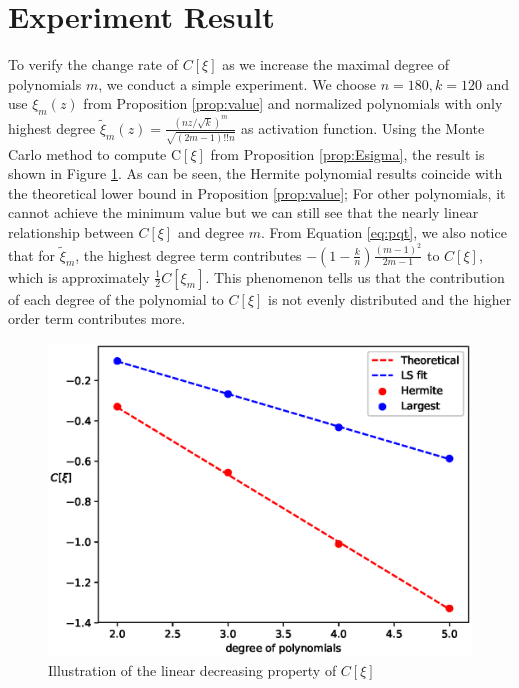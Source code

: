 \documentclass[conference]{IEEEtran}
\begin{document}
\section{Experiment Result}\label{sec:er}

To verify the change rate of $C[\xi]$ as we increase the maximal degree of polynomials $m$,
we conduct a simple experiment. We choose $n=180, k=120$ and use $\xi_m(z)$ from Proposition
\ref{prop:value} and normalized polynomials with only highest degree $\tilde{\xi}_m(z) = \frac{(nz/\sqrt{k})^m}{\sqrt{(2m-1)!!n}}$ as activation function. Using the Monte Carlo method to compute $\mathrm{C}[\xi]$ from Proposition \ref{prop:Esigma}, the result is shown in Figure \ref{fig:fixednk}. As can be seen, the Hermite polynomial results coincide with the theoretical lower bound in Proposition \ref{prop:value}; For other polynomials, it cannot achieve the minimum value but we can still see that the nearly linear relationship between $C[\xi]$ and degree $m$. From Equation \eqref{eq:pqt}, we also notice that for $\tilde{\xi}_m$, the highest degree term contributes $-(1-\frac{k}{n})\frac{(m-1)^2}{2m-1}$ to $C[\xi]$, which is approximately $\frac{1}{2} C[\xi_m]$. This phenomenon tells us that the contribution of each degree of the polynomial to $C[\xi]$ is not evenly distributed and
the higher order term contributes more.  


\begin{figure}
    \includegraphics[width=\linewidth]{fixed_nk.eps}
    \caption{Illustration of the linear decreasing property of $C[\xi]$}\label{fig:fixednk}
\end{figure}
\end{document}
